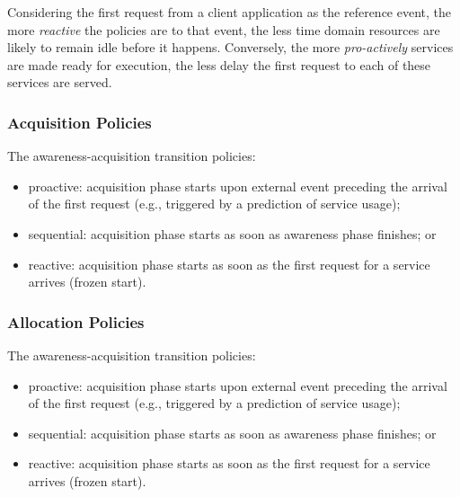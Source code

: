 Considering the first request from a client application as the reference event, the more \textit{reactive} the policies are to that event, the less time domain resources are likely to remain idle before it happens. Conversely, the more \textit{pro-actively} services are made ready for execution, the less delay the first request to each of these services are served. 

\subsubsection{Acquisition Policies}

The awareness-acquisition transition policies: 

\begin{itemize}

\item proactive: acquisition phase starts upon external event preceding the arrival of the first request (e.g., triggered by a prediction of service usage); 

\item sequential: acquisition phase starts as soon as awareness phase finishes; or

\item reactive: acquisition phase starts as soon as the first request for a service arrives (frozen start).

\end{itemize}


\subsubsection{Allocation Policies}

The awareness-acquisition transition policies: 

\begin{itemize}

\item proactive: acquisition phase starts upon external event preceding the arrival of the first request (e.g., triggered by a prediction of service usage); 

\item sequential: acquisition phase starts as soon as awareness phase finishes; or

\item reactive: acquisition phase starts as soon as the first request for a service arrives (frozen start).

\end{itemize}


